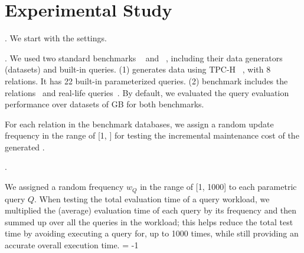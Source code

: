 \vspace{-0.3ex}
\section{Experimental Study}
\label{sec-expt}
\vspace{-0.4ex}



. We start with the settings.

. We used two standard benchmarks
\tpch~\cite{tpch} and \imdb~\cite{LeisGMBK015}, including their
data generators (datasets) and built-in queries.
(1) \tpch generates data using {\small TPC-H}
~\cite{tpch}, with 8 relations. It has 22 built-in
parameterized \SQL queries.
(2) \imdb benchmark includes the \imdb relations~\cite{imdbdata}
and \xx real-life \SQL queries~\cite{imdbquery}.
By default, we evaluated the query evaluation performance over
datasets of \xx GB for both benchmarks.

For each relation in the benchmark databases, we assign a random
update frequency in the range of [1, ] for testing the
incremental maintenance cost of the generated \bdss. 


.

\vspace{0.6ex}
We assigned a random frequency $w_{Q}$ in the range
of [1, 1000] to each
parametric query $Q$. When testing the total
evaluation time of a query workload, we multiplied the (average)
evaluation time of each query by its frequency and then summed up
over all the queries in the workload; this helps reduce the total
test time by avoiding executing a query for, \eg up to 1000
times, while still providing an accurate overall execution time.
\looseness = -1


